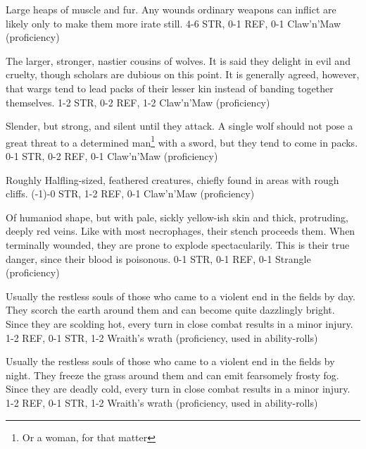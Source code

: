 {
    Large heaps of muscle and fur. Any wounds ordinary weapons can inflict are likely only to make them more irate still.
}
{
    4-6 STR, 0-1 REF, 0-1 Claw'n'Maw (proficiency)
}

{
    The larger, stronger, nastier cousins of wolves. It is said they delight in evil and cruelty, though scholars
    are dubious on this point. It is generally agreed, however, that wargs tend to lead packs of their lesser kin
    instead of banding together themselves.
}{
    1-2 STR, 0-2 REF, 1-2 Claw'n'Maw (proficiency)
}

{
    Slender, but strong, and silent until they attack. A single wolf should not pose a great threat to a determined
    man\footnote{Or a woman, for that matter} with a sword, but they tend to come in packs.
}{
    0-1 STR, 0-2 REF, 0-1 Claw'n'Maw (proficiency)
}

{
    Roughly Halfling-sized, feathered creatures, chiefly found in areas with rough cliffs.
}{
    (-1)-0 STR, 1-2 REF, 0-1 Claw'n'Maw (proficiency)
}


{
    Of humaniod shape, but with pale, sickly yellow-ish skin and thick, protruding, deeply red veins. Like
    with most necrophages, their stench proceeds them. When terminally wounded, they are prone to explode
    spectacularily. This is their true danger, since their blood is poisonous.
}{
    0-1 STR, 0-1 REF, 0-1 Strangle (proficiency)
}


{
    Usually the restless souls of those who came to a violent end in the fields by day. They scorch the earth around them
    and can become quite dazzlingly bright. Since they are scolding hot, every turn in close combat results in a minor injury.
}{
    1-2 REF, 0-1 STR, 1-2 Wraith's wrath (proficiency, used in ability-rolls)
}


{
    Usually the restless souls of those who came to a violent end in the fields by night. They freeze the grass around them
    and can emit fearsomely frosty fog. Since they are deadly cold, every turn in close combat results in a minor injury.
}{
    1-2 REF, 0-1 STR, 1-2 Wraith's wrath (proficiency, used in ability-rolls)
}

